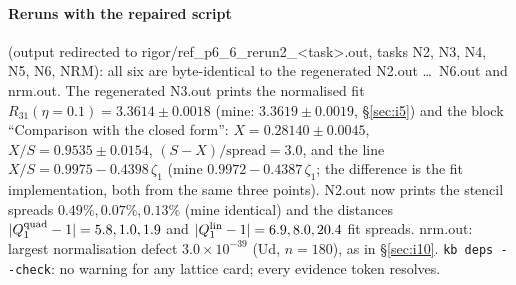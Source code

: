 \documentclass[11pt]{article}
\begin{document}
\paragraph{Reruns with the repaired script} (output redirected to rigor/ref\_p6\_6\_rerun2\_\textless task\textgreater.out, tasks N2, N3, N4, N5, N6, NRM):
all six are byte-identical to the regenerated N2.out \ldots\ N6.out and nrm.out. The regenerated N3.out prints the
normalised fit $R_{31}(\eta=0.1)=3.3614\pm0.0018$ (mine: $3.3619\pm0.0019$, \S\ref{sec:i5}) and the block ``Comparison
with the closed form'': $X=0.28140\pm0.0045$, $X/S=0.9535\pm0.0154$, $(S-X)/\text{spread}=3.0$, and the line
$X/S=0.9975-0.4398\,\zeta_1$ (mine $0.9972-0.4387\,\zeta_1$; the difference is the fit implementation, both from
the same three points). N2.out now prints the stencil spreads $0.49\%,0.07\%,0.13\%$ (mine identical) and the
distances $|Q_1^{\rm quad}-1|=5.8,1.0,1.9$ and $|Q_1^{\rm lin}-1|=6.9,8.0,20.4$ fit spreads. nrm.out: largest
normalisation defect $3.0\times10^{-39}$ (Ud, $n=180$), as in \S\ref{sec:i10}. \texttt{kb deps -{}-check}: no
warning for any lattice card; every evidence token resolves.
\end{document}
